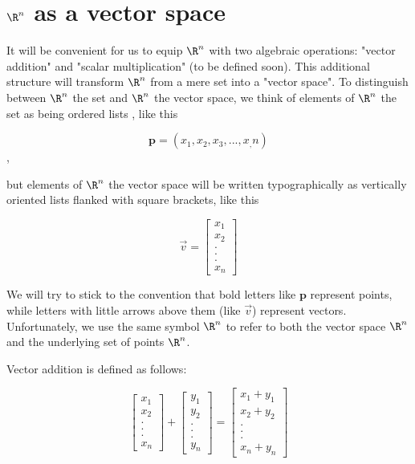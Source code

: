
\section{$\R^n$ as a vector space}
It will be convenient for us to equip $\R^n$ with two algebraic operations:  "vector addition" and "scalar multiplication" (to be defined soon).
This additional structure will transform $\R^n$ from a mere set into a "vector space".  To distinguish between $\R^n$ the set and $\R^n$ the vector space,
 we think of elements of $\R^n$ the set as being ordered lists , like this 
 
 $$\mathbf{p} = (x_1,x_2,x_3, ...,x_,n)$$, 
 
 but elements of $\R^n$ the vector space will be written typographically as vertically oriented lists flanked with square brackets, like this 
 
  $$ \vec{v}= \begin{bmatrix}
 		x_1\\
 		x_2\\
 		.\\
 		.\\
 		.\\
 		x_n
 	 \end{bmatrix}
	 	$$
 
We will try to stick to the convention that bold letters like $\mathbf{p}$ represent points, while letters with little arrows above them (like $\vec{v}$) represent vectors. Unfortunately, we use the same symbol $\R^n$ to refer to both the vector space $\R^n$ and the underlying set of points $\R^n$.
 
 Vector addition is defined as follows:
 
 $$\begin{bmatrix}
 		x_1\\
 		x_2\\
 		.\\
 		.\\
 		.\\
 		x_n
 	 \end{bmatrix} +
 		\begin{bmatrix}
 		y_1\\
 		y_2\\
 		.\\
 		.\\
 		.\\
 		y_n
 	 \end{bmatrix}=
 	 \begin{bmatrix}
 		x_1+y_1\\
 		x_2+y_2\\
 		.\\
 		.\\
 		.\\
 		x_n+y_n
 	 \end{bmatrix}
	 	$$
	 	
